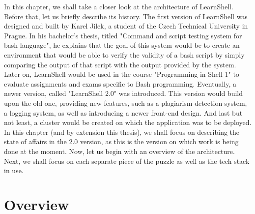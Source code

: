 \documentclass[thesis=B,english]{FITthesis}[2019/12/23]
\begin{document}
In this chapter, we shall take a closer look at the architecture of LearnShell. 
\newline
\newline
Before that, let us briefly describe its history. The first version of LearnShell was designed and built by Karel Jilek, a student of the Czech Technical University in Prague. In his bachelor's thesis, titled "Command and script testing system for bash language", he explains that the goal of this system would be to create an environment that would be able to verify the validity of a bash script by simply comparing the output of that script with the output provided by the system. \cite{learnshell-jilek} Later on, LearnShell would be used in the course "Programming in Shell 1" to evaluate assignments and exams specific to Bash programming. Eventually, a newer version, called "LearnShell 2.0" was introduced. This version would build upon the old one, providing new features, such as a plagiarism detection system, a logging system, as well as introducing a newer front-end design. And last but not least, a cluster would be created on which the application was to be deployed. In this chapter (and by extension this thesis), we shall focus on describing the state of affairs in the 2.0 version, as this is the version on which work is being done at the moment.
\newline
\newline
Now, let us begin with an overview of the architecture. Next, we shall focus on each separate piece of the puzzle as well as the tech stack in use.

\section{Overview}
\end{document}
